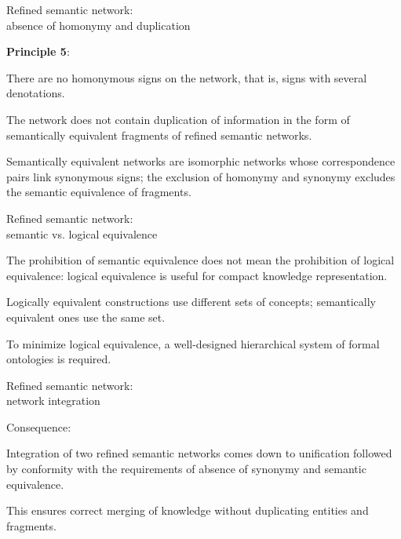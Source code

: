 \begin{frame}{Refined semantic network:\\absence of homonymy and duplication}
	\topline
	\justifying
	
	\textbf{Principle 5}:
	\begin{textitemize}
		\item There are no homonymous signs on the network, that is, signs with several denotations.
		\item The network does not contain duplication of information in the form of semantically equivalent fragments of refined semantic networks.
	\end{textitemize}
	
	\medskip
	Semantically equivalent networks are isomorphic networks whose correspondence pairs link synonymous signs; the exclusion of homonymy and synonymy excludes the semantic equivalence of fragments.
	
\end{frame}


\begin{frame}{Refined semantic network:\\semantic vs. logical equivalence}
	\topline
	\justifying
	
	\begin{textitemize}
		\item The prohibition of semantic equivalence does not mean the prohibition of logical equivalence: logical equivalence is useful for compact knowledge representation.
		\item Logically equivalent constructions use different sets of concepts; semantically equivalent ones use the same set.
		\item To minimize logical equivalence, a well-designed hierarchical system of formal ontologies is required.
	\end{textitemize}
	
\end{frame}


\begin{frame}{Refined semantic network:\\network integration}
	\topline
	\justifying
	
	Consequence:
	\begin{textitemize}
		\item Integration of two refined semantic networks comes down to unification followed by conformity with the requirements of absence of synonymy and semantic equivalence.
		\item This ensures correct merging of knowledge without duplicating entities and fragments.
	\end{textitemize}
	
\end{frame}


